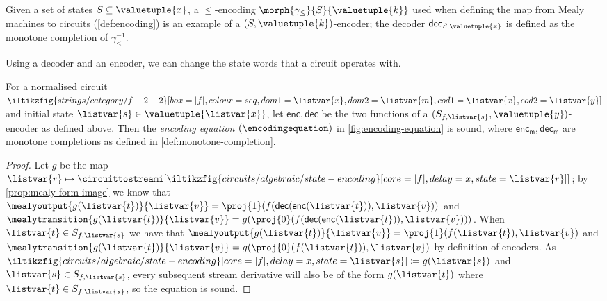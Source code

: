 \begin{example}
    Given a set of states \(S \subseteq \valuetuple{x}\), a \(\leq\)-encoding
    \(\morph{\gamma_\leq}{S}{\valuetuple{k}}\) used when defining the map from
    Mealy machines to circuits (\cref{def:encoding}) is an example of a
    \((S,\valuetuple{k})\)-encoder; the decoder
    \(\mathsf{dec}_{S,\valuetuple{x}}\) is defined as the monotone completion
    of \(\gamma_\leq^{-1}\).
\end{example}

Using a decoder and an encoder, we can change the state words that a circuit
operates with.

\begin{proposition}\label{prop:encoding-equation}
    For a normalised circuit \(
    \iltikzfig{strings/category/f-2-2}[box=|f|,colour=seq,dom1=\listvar{x},dom2=\listvar{m},cod1=\listvar{x},cod2=\listvar{y}]
    \) and initial state \(\listvar{s} \in \valuetuple{\listvar{x}}\), let
    \(\mathsf{enc},\mathsf{dec}\) be the two functions of a
    \((S_{f,\listvar{s}},\valuetuple{y})\)-encoder as defined above.
    Then the \emph{encoding equation} \((\encodingequation)\) in
    \cref{fig:encoding-equation} is sound, where
    \(\mathsf{enc}_\mathsf{m},\mathsf{dec}_\mathsf{m}\) are monotone completions
    as defined in \cref{def:monotone-completion}.
\end{proposition}
\begin{proof}
    Let \(g\) be the map \(\listvar{r} \mapsto
    \circuittostreami[\iltikzfig{circuits/algebraic/state-encoding}[core=|f|,delay=x,state=\listvar{r}]]
    \); by \cref{prop:mealy-form-image} we know that \(
    \mealyoutput{g(\listvar{t})}{\listvar{v}}
    =
    \proj{1}(f(\mathsf{dec}(\mathsf{enc}(\listvar{t})), \listvar{v}))
    \) and \(
    \mealytransition{g(\listvar{t})}{\listvar{v}}
    =
    g(\proj{0}(f(\mathsf{dec}(\mathsf{enc}(\listvar{t})), \listvar{v})))
    \).
    When \(\listvar{t} \in S_{f, \listvar{s}}\) we have that \(
    \mealyoutput{g(\listvar{t})}{\listvar{v}}
    =
    \proj{1}(f(\listvar{t}), \listvar{v})
    \) and \(
    \mealytransition{g(\listvar{t})}{\listvar{v}}
    =
    g(\proj{0}(f(\listvar{t})), \listvar{v})
    \) by definition of encoders.
    As \(
    \iltikzfig{circuits/algebraic/state-encoding}[core=|f|,delay=x,state=\listvar{s}]
    \coloneqq
    g(\listvar{s})
    \) and \(\listvar{s} \in S_{f,\listvar{s}}\),
    every subsequent stream derivative will also be of the form
    \(g(\listvar{t})\) where \(\listvar{t} \in S_{f,\listvar{s}}\), so the
    equation is sound.
\end{proof}

